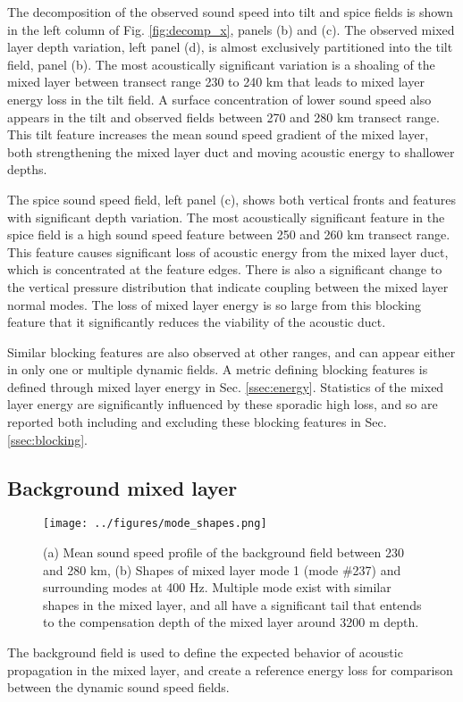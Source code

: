 \documentclass[preprint,NumberedRefs]{JASA}
\begin{document}
The decomposition of the observed sound speed into tilt and spice fields is shown in the left column of Fig. \ref{fig:decomp_x}, panels (b) and (c). The observed mixed layer depth variation, left panel (d), is almost exclusively partitioned into the tilt field, panel (b). The most acoustically significant variation is a shoaling of the mixed layer between transect range 230 to 240 km that leads to mixed layer energy loss in the tilt field. A surface concentration of lower sound speed also appears in the tilt and observed fields between 270 and 280 km transect range. This tilt feature increases the mean sound speed gradient of the mixed layer, both strengthening the mixed layer duct and moving acoustic energy to shallower depths.

The spice sound speed field, left panel (c), shows both vertical fronts and features with significant depth variation. The most acoustically significant feature in the spice field is a high sound speed feature between 250 and 260 km transect range. This feature causes significant loss of acoustic energy from the mixed layer duct, which is concentrated at the feature edges. There is also a significant change to the vertical pressure distribution that indicate coupling between the mixed layer normal modes. The loss of mixed layer energy is so large from this blocking feature that it significantly reduces the viability of the acoustic duct.

Similar blocking features are also observed at other ranges, and can appear either in only one or multiple dynamic fields. A metric defining blocking features is defined through mixed layer energy in Sec. \ref{ssec:energy}. Statistics of the mixed layer energy are significantly influenced by these sporadic high loss, and so are reported both including and excluding these blocking features in Sec. \ref{ssec:blocking}.

\subsection{Background mixed layer}\label{ssec:bg}
\begin{figure}
\texttt{[image: ../figures/mode\_shapes.png]}
    \caption{\label{fig:bg_modes}{(a) Mean sound speed profile of the background field between 230 and 280 km, (b) Shapes of mixed layer mode 1 (mode \#237) and surrounding modes at 400 Hz. Multiple mode exist with similar shapes in the mixed layer, and all have a significant tail that entends to the compensation depth of the mixed layer around 3200 m depth.}}
\end{figure}
The background field is used to define the expected behavior of acoustic propagation in the mixed layer, and create a reference energy loss for comparison between the dynamic sound speed fields.
\end{document}
